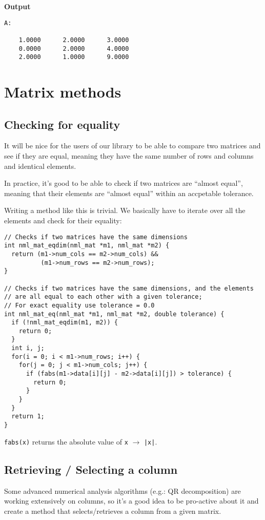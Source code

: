 \hsep
{\bf Output}
\begin{verbatim}
A:

    1.0000      2.0000      3.0000  
    0.0000      2.0000      4.0000  
    2.0000      1.0000      9.0000  
\end{verbatim}

\section{Matrix methods}

\subsection{Checking for equality}

It will be nice for the users of our library to be able to compare two matrices and see if they are equal, meaning they have the same number of rows and columns and identical elements.

In practice, it’s good to be able to check if two matrices are ``almost equal'', meaning that their elements are ``almost equal'' within an accpetable tolerance.

Writing a method like this is trivial. We basically have to iterate over all the elements and check for their equality:

\begin{verbatim}
// Checks if two matrices have the same dimensions
int nml_mat_eqdim(nml_mat *m1, nml_mat *m2) {
  return (m1->num_cols == m2->num_cols) &&
          (m1->num_rows == m2->num_rows);
}

// Checks if two matrices have the same dimensions, and the elements
// are all equal to each other with a given tolerance;
// For exact equality use tolerance = 0.0
int nml_mat_eq(nml_mat *m1, nml_mat *m2, double tolerance) {
  if (!nml_mat_eqdim(m1, m2)) {
    return 0;
  }
  int i, j;
  for(i = 0; i < m1->num_rows; i++) {
    for(j = 0; j < m1->num_cols; j++) {
      if (fabs(m1->data[i][j] - m2->data[i][j]) > tolerance) {
        return 0;
      }
    }
  }
  return 1;
}
\end{verbatim}
{\tt fabs(x)} returns the absolute value of {\tt x} $\rightarrow$ {\tt |x|}.

\subsection{Retrieving / Selecting a column}

Some advanced numerical analysis algorithms (e.g.: QR decomposition) are working extensively on columns, so it’s a good idea to be pro-active about it and create a method that selects/retrieves a column from a given matrix.
\\


